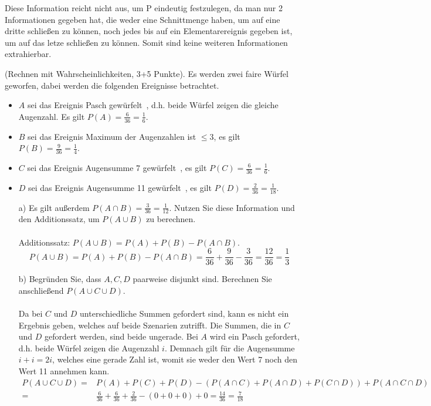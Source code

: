 \documentclass[twoside]{article}
\begin{document}
\begin{enumerate}
	
	Diese Information reicht nicht aus, um P eindeutig festzulegen, da man nur 2 Informationen gegeben hat, die weder eine Schnittmenge haben, um auf eine dritte schließen zu können, noch jedes bis auf ein Elementarereignis gegeben ist, um auf das letze schließen zu können.
	Somit sind keine weiteren Informationen extrahierbar.
	
	
\end{enumerate}

(Rechnen mit Wahrscheinlichkeiten, 3+5 Punkte).
Es werden zwei faire Würfel geworfen, dabei werden die folgenden Ereignisse betrachtet.
\begin{itemize}
	\item $A$ sei das Ereignis \dq Pasch gewürfelt\dq ~, d.h. beide Würfel zeigen die gleiche Augenzahl.
	Es gilt $P(A)=\frac{6}{36}=\frac{1}{6}$.
	\item $B$ sei das Ereignis \dq Maximum der Augenzahlen ist $\leq 3$, es gilt $P(B) = \frac{9}{36} = \frac{1}{4}$.
	\item $C$ sei das Ereignis \dq Augensumme 7 gewürfelt\dq ~, es gilt $P(C) = \frac{6}{36} = \frac{1}{6}$.
	\item $D$ sei das Ereignis \dq Augensumme 11 gewürfelt\dq ~, es gilt $P(D) = \frac{2}{36} = \frac{1}{18}$.
\end{itemize}
\begin{enumerate}
	\item[a)] Es gilt außerdem $P(A \cap B) = \frac{3}{36} = \frac{1}{12}$.
	Nutzen Sie diese Information und den Additionssatz, um $P(A \cup B)$ zu berechnen.\\\vspace{.5cm}\\
	Additionssatz: $P(A \cup B) = P(A) + P(B) - P(A \cap B)$.
	\[
		P(A \cup B) = P(A) + P(B) - P(A \cap B) = \frac{6}{36} + \frac{9}{36} - \frac{3}{36} = \frac{12}{36} = \frac{1}{3}
	\]
	\item[b)] Begründen Sie, dass $A,C,D$ paarweise disjunkt sind.
	Berechnen Sie anschließend $P(A \cup C \cup D)$.\\\vspace{.5cm}\\
	Da bei $C$ und $D$ unterschiedliche Summen gefordert sind, kann es nicht ein Ergebnis geben, welches auf beide Szenarien zutrifft.
	Die Summen, die in $C$ und $D$ gefordert werden, sind beide ungerade.
	Bei $A$ wird ein Pasch gefordert, d.h. beide Würfel zeigen die Augenzahl $i$.
	Demnach gilt für die Augensumme $i+i=2i$, welches eine gerade Zahl ist, womit sie weder den Wert 7 noch den Wert 11 annehmen kann.
	\begin{align*}
		P(A \cup C \cup D)	=& P(A) + P(C) + P(D) - (P(A \cap C) + P(A \cap D) + P(C \cap D)) + P(A \cap C \cap D)\\
							=& \frac{6}{36} + \frac{6}{36} + \frac{2}{36} - (0 + 0 + 0) + 0 = \frac{14}{36} = \frac{7}{18}
	\end{align*}
\end{enumerate}
\fi
\end{document}
